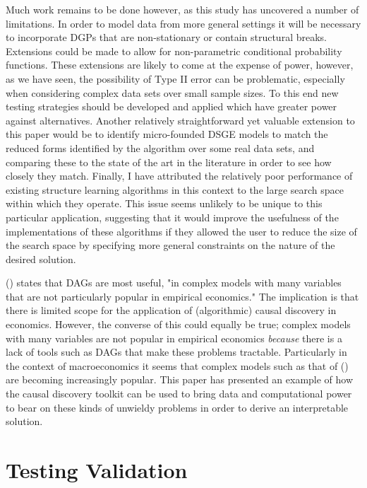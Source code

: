 \documentclass{article}
\begin{document}
Much work remains to be done however, as this study has uncovered a number of limitations. In order to model data from more general settings it will be necessary to incorporate DGPs that are non-stationary or contain structural breaks. Extensions could be made to allow for non-parametric conditional probability functions. These extensions are likely to come at the expense of power, however, as we have seen, the possibility of Type II error can be problematic, especially when considering complex data sets over small sample sizes. To this end new testing strategies should be developed and applied which have greater power against alternatives. Another relatively straightforward yet valuable extension to this paper would be to identify micro-founded DSGE models to match the reduced forms identified by the algorithm over some real data sets, and comparing these to the state of the art in the literature in order to see how closely they match. Finally, I have attributed the relatively poor performance of existing structure learning algorithms in this context to the large search space within which they operate. This issue seems unlikely to be unique to this particular application, suggesting that it would improve the usefulness of the implementations of these algorithms if they allowed the user to reduce the size of the search space by specifying more general constraints on the nature of the desired solution.

\citeauthor{imbens2019potential} (\citeyear{imbens2019potential}) states that DAGs are most useful, "in complex models with many variables that are not particularly popular in empirical economics." The implication is that there is limited scope for the application of (algorithmic) causal discovery in economics. However, the converse of this could equally be true; complex models with many variables are not popular in empirical economics \textit{because} there is a lack of tools such as DAGs that make these problems tractable. Particularly in the context of macroeconomics it seems that complex models such as that of \citeauthor{smets2007shocks} (\citeyear{smets2007shocks}) are becoming increasingly popular. This paper has presented an example of how the causal discovery toolkit can be used to bring data and computational power to bear on these kinds of unwieldy problems in order to derive an interpretable solution.

\newpage
\printbibliography
\newpage

\appendix

\section{Testing Validation} \label{testing_validation}
\end{document}
